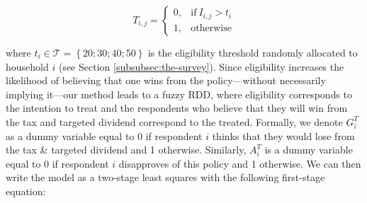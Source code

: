 \documentclass[12pt]{article} %
\begin{document}
\begin{equation}
T_{i,j} =
\begin{cases}
  0, & \text{if}\ I_{i,j} > t_i \\
  1, & \text{otherwise}
\end{cases}
\end{equation}

\medskip



\noindent
where $t_i\in \mathcal{T}=\left\{20;30;40;50\right\}$ is the eligibility threshold randomly allocated to household $i$ (see Section \ref{subsubsec:the-survey}). Since eligibility increases the likelihood of believing that one wins from the policy---without necessarily implying it---our method leads to a fuzzy RDD, where eligibility corresponds to the intention to treat and the respondents who believe that they will win from the tax and targeted dividend correspond to the treated. Formally, we denote $G_i^T$ as a dummy variable equal to 0 if respondent $i$ thinks that they would lose from the tax \& targeted dividend and 1 otherwise. Similarly, $A_i^T$ is a dummy variable equal to 0 if respondent $i$ disapproves of this policy and 1 otherwise. We can then write the model as a two-stage least squares with the following first-stage equation:
\end{document}
